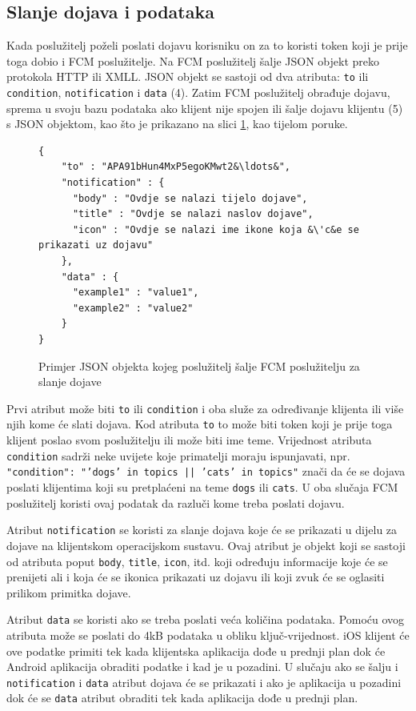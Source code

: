 \documentclass[times, utf8, zavrsni]{fer}
\begin{document}
{\subsection{Slanje dojava i podataka}
Kada poslužitelj poželi poslati dojavu korisniku on za to koristi token koji je prije toga dobio i FCM poslužitelje. Na FCM poslužitelj šalje JSON objekt preko protokola HTTP ili XMLL. JSON objekt se sastoji od dva atributa: {\tt to}  ili {\tt condition}, {\tt notification} i {\tt data} (4). Zatim FCM poslužitelj obrađuje dojavu, sprema u svoju bazu podataka ako klijent nije spojen ili šalje dojavu klijentu (5) s JSON objektom, kao što je prikazano na slici \ref{lst:json-dojava}, kao tijelom poruke.

\begin{figure}
\begin{lstlisting}
{
    "to" : "APA91bHun4MxP5egoKMwt2&\ldots&",
    "notification" : {
      "body" : "Ovdje se nalazi tijelo dojave",
      "title" : "Ovdje se nalazi naslov dojave",
      "icon" : "Ovdje se nalazi ime ikone koja &\'c&e se prikazati uz dojavu"
    },
    "data" : {
      "example1" : "value1",
      "example2" : "value2"
    }
}
\end{lstlisting}
\caption{Primjer JSON objekta kojeg poslužitelj šalje FCM poslužitelju za slanje dojave}
\label{lst:json-dojava}
\end{figure}

Prvi atribut može biti {\tt to} ili {\tt condition} i oba služe za određivanje klijenta ili više njih kome će slati dojava. Kod atributa {\tt to} to može biti token koji je prije toga klijent poslao svom poslužitelju ili može biti ime teme. Vrijednost atributa {\tt condition} sadrži neke uvijete koje primatelji moraju ispunjavati, npr. {\tt "condition": "'dogs' in topics || 'cats' in topics"} znači da će se dojava poslati klijentima koji su pretplaćeni na teme {\tt dogs}  ili {\tt cats}. U oba slučaja FCM poslužitelj koristi ovaj podatak da razluči kome treba poslati dojavu.

Atribut {\tt notification} se koristi za slanje dojava koje će se prikazati u dijelu za dojave na klijentskom operacijskom sustavu. Ovaj atribut je objekt koji se sastoji od atributa poput {\tt body}, {\tt title}, {\tt icon}, itd. koji određuju informacije koje će se prenijeti ali i koja će se ikonica prikazati uz dojavu ili koji zvuk će se oglasiti prilikom primitka dojave.

Atribut {\tt data} se koristi ako se treba poslati veća količina podataka. Pomoću ovog atributa može se poslati do 4kB podataka u obliku ključ-vrijednost. iOS klijent će ove podatke primiti tek kada klijentska aplikacija dođe u prednji plan dok će Android aplikacija obraditi podatke i kad je u pozadini. U slučaju ako se šalju i {\tt notification} i {\tt data} atribut dojava će se prikazati i ako je aplikacija u pozadini dok će se {\tt data} atribut obraditi tek kada aplikacija dođe u prednji plan.\citep{fcm2017}

}
\end{document}
